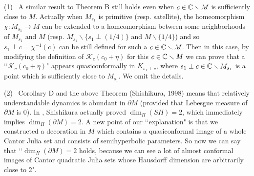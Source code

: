 \begin{rem*}
(1) \ 
A similar result to Theorem B still holds even when $c \in \mathbb C \smallsetminus M$
is sufficiently close to $M$. Actually when $M_{s_1}$ is primitive (resp. satellite),
the homeomorphism $\chi : M_{s_1} \to M$ can be extended to a homeomorphism between
some neighborhoods of $M_{s_1}$ and $M$ 
(resp. $M_{s_1} \smallsetminus \{ s_1 \perp (1/4) \}$ and 
$M \smallsetminus \{ 1/4 \}$)
and so $s_1 \perp c = \chi^{-1}(c)$ can be still defined for such a 
$c \in \mathbb C \smallsetminus M$. Then in this case, by modifying the definition 
of ${\mathcal K}_{c}(c_0+\eta)$ for this $c \in \mathbb C \smallsetminus M$ we can 
prove that a \lq\lq ${\mathcal K}_{c}(c_0+\eta)$" appears quasiconformally
in $K_{s_1 \perp c}$, where $s_1 \perp c \in \mathbb C \smallsetminus M_{s_1}$ is a
point which is sufficiently close to $M_{s_1}$. We omit the details.


\noin
(2) \ 
Corollary D and the above Theorem (Shishikura, 1998) means that relatively
understandable dynamics is abundant in $\partial M$ (provided that Lebesgue
measure of $\partial M$ is 0). 
In \cite[p.225, THEOREM A]{Shishikura 1998}, Shishikura actually proved
$\dim_H(SH) = 2$, which immediately implies $\dim_H(\partial M) = 2$.
A new point of our \lq\lq explanation" is that we constructed a decoration 
in $M$ which contains a quasiconformal image of a whole Cantor Julia set
and consists of semihyperbolic parameters. 
So now we can say that \lq\lq$\dim_H(\partial M) = 2$ holds, because
we can see a lot of almost conformal images of Cantor quadratic Julia sets
whose Hausdorff dimension are arbitrarily close to 2".


\end{rem*}
